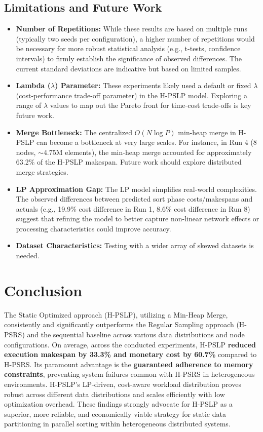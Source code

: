 \documentclass[]{interact}
\theoremstyle{plain}
\theoremstyle{definition}
\theoremstyle{remark}
\begin{document}
\subsection{Limitations and Future Work}
\begin{itemize}
    \item \textbf{Number of Repetitions:} While these results are based on multiple runs (typically two seeds per configuration), a higher number of repetitions would be necessary for more robust statistical analysis (e.g., t-tests, confidence intervals) to firmly establish the significance of observed differences. The current standard deviations are indicative but based on limited samples.
    \item \textbf{Lambda ($\lambda$) Parameter:} These experiments likely used a default or fixed $\lambda$ (cost-performance trade-off parameter) in the H-PSLP model. Exploring a range of $\lambda$ values to map out the Pareto front for time-cost trade-offs is key future work.
    \item \textbf{Merge Bottleneck:} The centralized $O(N \log P)$ min-heap merge in H-PSLP can become a bottleneck at very large scales. For instance, in Run 4 (8 nodes, $\sim$4.75M elements), the min-heap merge accounted for approximately 63.2\% of the H-PSLP makespan. Future work should explore distributed merge strategies.
    \item \textbf{LP Approximation Gap:} The LP model simplifies real-world complexities. The observed differences between predicted sort phase costs/makespans and actuals (e.g., 19.9\% cost difference in Run 1, 8.6\% cost difference in Run 8) suggest that refining the model to better capture non-linear network effects or processing characteristics could improve accuracy.
    \item \textbf{Dataset Characteristics:} Testing with a wider array of skewed datasets is needed.
\end{itemize}

\section{Conclusion}
\label{sec:conclusion}

The Static Optimized approach (H-PSLP), utilizing a Min-Heap Merge, consistently and significantly outperforms the Regular Sampling approach (H-PSRS) and the sequential baseline across various data distributions and node configurations. On average, across the conducted experiments, H-PSLP \textbf{reduced execution makespan by 33.3\% and monetary cost by 60.7\%} compared to H-PSRS. Its paramount advantage is the \textbf{guaranteed adherence to memory constraints}, preventing system failures common with H-PSRS in heterogeneous environments. H-PSLP's LP-driven, cost-aware workload distribution proves robust across different data distributions and scales efficiently with low optimization overhead. These findings strongly advocate for H-PSLP as a superior, more reliable, and economically viable strategy for static data partitioning in parallel sorting within heterogeneous distributed systems. 
\end{document}
